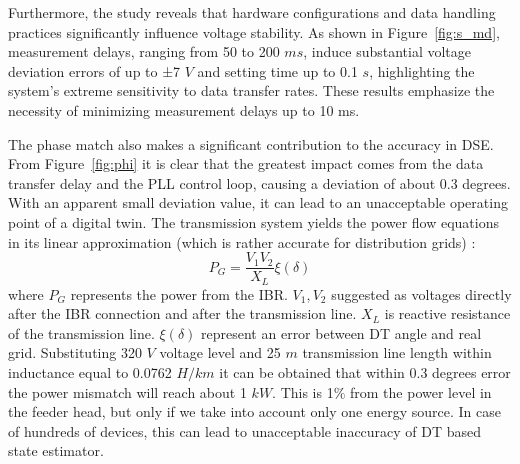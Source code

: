 Furthermore, the study reveals that hardware configurations and data handling practices significantly influence voltage stability. As shown in Figure~\cref{fig:s_md}, measurement delays, ranging from 50 to 200 $ms$, induce substantial voltage deviation errors of up to ±7 $V$ and setting time up to 0.1 $s$, highlighting the system's extreme sensitivity to data transfer rates. These results emphasize the necessity of minimizing measurement delays up to 10 ms.

The phase match also makes a significant contribution to the accuracy in DSE. From Figure~\cref{fig:phi} it is clear that the greatest impact comes from the data transfer delay and the PLL control loop, causing a deviation of about 0.3 degrees. With an apparent small deviation value, it can lead to an unacceptable operating point of a digital twin. The transmission system yields the power flow equations in its linear approximation (which is rather accurate for distribution grids) \autocite{machowski2020power}: 
\begin{equation}
    P_G = \frac{V_1 V_2}{X_L} \xi(\delta)
    \label{placeholder}
\end{equation}
where $P_G$ represents the power from the IBR. $V_1, V_2$ suggested as voltages directly after the IBR connection and after the transmission line. $X_L$ is reactive resistance of the transmission line. $\xi(\delta)$ represent an error between DT angle and real grid. Substituting 320 $V$ voltage level and 25 $m$ transmission line length within inductance equal to 0.0762 $H/km$ it can be obtained that within 0.3 degrees error the power mismatch will reach about 1 $kW$. This is 1$\%$ from the power level in the feeder head, but only if we take into account only one energy source. In case of hundreds of devices, this can lead to unacceptable inaccuracy of DT based state estimator.

